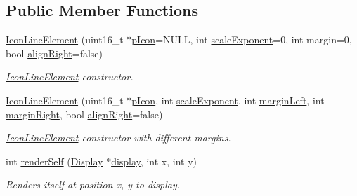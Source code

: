 \subsection*{Public Member Functions}
\begin{DoxyCompactItemize}
\item 
\mbox{\hyperlink{classScreen_1_1IconLineElement_ad465a9f557b9f7e659ebfb8a5a995ca6}{Icon\+Line\+Element}} (uint16\+\_\+t $\ast$\mbox{\hyperlink{classScreen_1_1IconLineElement_ae84108a5bfda7ba013401c067a8c9aca}{p\+Icon}}=N\+U\+LL, int \mbox{\hyperlink{classScreen_1_1IconLineElement_a95ab319fab5abe27266a092fdb75b58e}{scale\+Exponent}}=0, int margin=0, bool \mbox{\hyperlink{classScreen_1_1LineElement_a0c5f4e33c2df1dce8e4e45b90dac1423}{align\+Right}}=false)
\begin{DoxyCompactList}\small\item\em \mbox{\hyperlink{classScreen_1_1IconLineElement}{Icon\+Line\+Element}} constructor. \end{DoxyCompactList}\item 
\mbox{\hyperlink{classScreen_1_1IconLineElement_a7bba2dffbe294ad65c4cda9d7e462bc6}{Icon\+Line\+Element}} (uint16\+\_\+t $\ast$\mbox{\hyperlink{classScreen_1_1IconLineElement_ae84108a5bfda7ba013401c067a8c9aca}{p\+Icon}}, int \mbox{\hyperlink{classScreen_1_1IconLineElement_a95ab319fab5abe27266a092fdb75b58e}{scale\+Exponent}}, int \mbox{\hyperlink{classScreen_1_1LineElement_a9ed23f9510a11334af9be6f53965f7a6}{margin\+Left}}, int \mbox{\hyperlink{classScreen_1_1LineElement_a3a2077f01072be8e8fd0f4539b85beb0}{margin\+Right}}, bool \mbox{\hyperlink{classScreen_1_1LineElement_a0c5f4e33c2df1dce8e4e45b90dac1423}{align\+Right}}=false)
\begin{DoxyCompactList}\small\item\em \mbox{\hyperlink{classScreen_1_1IconLineElement}{Icon\+Line\+Element}} constructor with different margins. \end{DoxyCompactList}\item 
int \mbox{\hyperlink{classScreen_1_1IconLineElement_a3ee090b31ee5061974552be4688d937b}{render\+Self}} (\mbox{\hyperlink{classDisplay}{Display}} $\ast$\mbox{\hyperlink{classScreen_aad713267725e8aa8a8def951a07de641}{display}}, int x, int y)
\begin{DoxyCompactList}\small\item\em Renders itself at position x, y to display. \end{DoxyCompactList}\end{DoxyCompactItemize}
